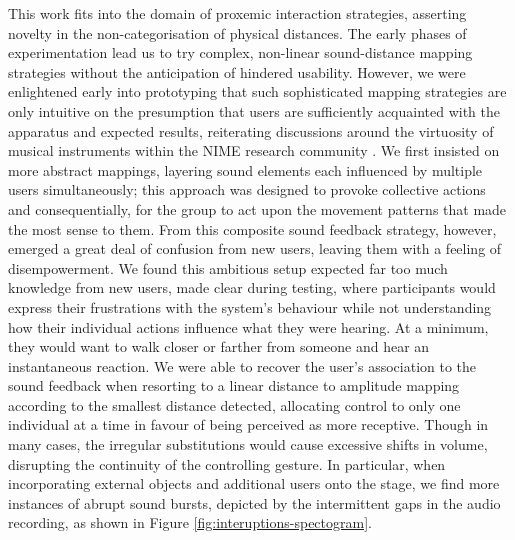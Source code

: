 This work fits into the domain of proxemic interaction strategies, asserting novelty in the non-categorisation of physical distances. The early phases of experimentation lead us to try complex, non-linear sound-distance mapping strategies without the anticipation of hindered usability. However, we were enlightened early into prototyping that such sophisticated mapping strategies are only intuitive on the presumption that users are sufficiently acquainted with the apparatus and expected results, reiterating discussions around the virtuosity of musical instruments within the NIME research community \citep{wu_supporting_2017}. We first insisted on more abstract mappings, layering sound elements each influenced by multiple users simultaneously; this approach was designed to provoke collective actions and consequentially, for the group to act upon the movement patterns that made the most sense to them. From this composite sound feedback strategy, however, emerged a great deal of confusion from new users, leaving them with a feeling of disempowerment. We found this ambitious setup expected far too much knowledge from new users, made clear during testing, where participants would express their frustrations with the system's behaviour while not understanding how their individual actions influence what they were hearing. At a minimum, they would want to walk closer or farther from someone and hear an instantaneous reaction. We were able to recover the user's association to the sound feedback when resorting to a linear distance to amplitude mapping according to the smallest distance detected, allocating control to only one individual at a time in favour of being perceived as more receptive. Though in many cases, the irregular substitutions would cause excessive shifts in volume, disrupting the continuity of the controlling gesture. In particular, when incorporating external objects and additional users onto the stage, we find more instances of abrupt sound bursts, depicted by the intermittent gaps in the audio recording, as shown in Figure \ref{fig:interuptions-spectogram}.

